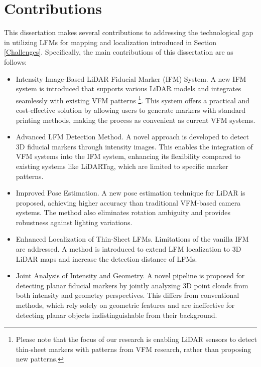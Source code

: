 \section{Contributions}
This dissertation makes several contributions to addressing the technological gap in utilizing LFMs for mapping and localization introduced in Section \ref{Challenges}. Specifically, the main contributions of this dissertation are as follows:
\begin{itemize}
     

\item Intensity Image-Based LiDAR Fiducial Marker (IFM) System. A new IFM system is introduced that supports various LiDAR models and integrates seamlessly with existing VFM patterns \footnote{Please note that the focus of our research is enabling LiDAR sensors to detect thin-sheet markers with patterns from VFM research, rather than proposing new patterns.}. This system offers a practical and cost-effective solution by allowing users to generate markers with standard printing methods, making the process as convenient as current VFM systems.

\item Advanced LFM Detection Method. A novel approach is developed to detect 3D fiducial markers through intensity images. This enables the integration of VFM systems into the IFM system, enhancing its flexibility compared to existing systems like LiDARTag, which are limited to specific marker patterns.

\item Improved Pose Estimation. A new pose estimation technique for LiDAR is proposed, achieving higher accuracy than traditional VFM-based camera systems. The method also eliminates rotation ambiguity and provides robustness against lighting variations.

\item Enhanced Localization of Thin-Sheet LFMs. Limitations of the vanilla IFM are addressed. A method is introduced to extend LFM localization to 3D LiDAR maps and increase the detection distance of LFMs.

\item Joint Analysis of Intensity and Geometry. A novel pipeline is proposed for detecting planar fiducial markers by jointly analyzing 3D point clouds from both intensity and geometry perspectives. This differs from conventional methods, which rely solely on geometric features and are ineffective for detecting planar objects indistinguishable from their background.


\end{itemize}

